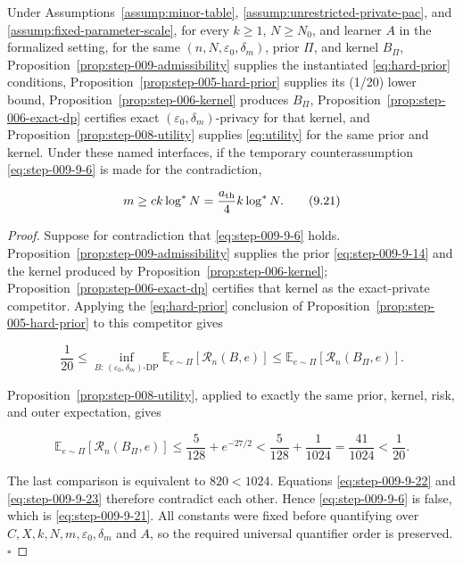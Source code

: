 \begin{proposition}
\label{prop:step-009-main-closure}
Under Assumptions~\ref{assump:minor-table},
\ref{assump:unrestricted-private-pac}, and
\ref{assump:fixed-parameter-scale}, for every \(k\ge1\), \(N\ge N_0\),
and learner \(A\) in the formalized setting, for the same
\((n,N,\varepsilon_0,\delta_m)\), prior \(\Pi\), and kernel \(B_\Pi\),
Proposition~\ref{prop:step-009-admissibility} supplies the instantiated
\eqref{eq:hard-prior} conditions, Proposition~\ref{prop:step-005-hard-prior} supplies
its (1/20) lower bound, Proposition~\ref{prop:step-006-kernel}
produces \(B_\Pi\), Proposition~\ref{prop:step-006-exact-dp} certifies
exact \((\varepsilon_0,\delta_m)\)-privacy for that kernel, and
Proposition~\ref{prop:step-008-utility} supplies \eqref{eq:utility} for the same
prior and kernel.  Under these named interfaces, if the temporary
counterassumption \eqref{eq:step-009-9-6} is made for the contradiction,

\[
m\ge c k\log^*N
=\frac{a_{\rm th}}4k\log^*N.
\tag{9.21}\label{eq:step-009-9-21}
\]

\end{proposition}

\begin{proof}
Suppose for contradiction that \eqref{eq:step-009-9-6} holds.
Proposition~\ref{prop:step-009-admissibility} supplies the prior \eqref{eq:step-009-9-14}
and the kernel produced by Proposition~\ref{prop:step-006-kernel};
Proposition~\ref{prop:step-006-exact-dp} certifies that kernel as the
exact-private competitor.  Applying the \eqref{eq:hard-prior} conclusion of
Proposition~\ref{prop:step-005-hard-prior} to this
competitor gives

\[
\frac1{20}
\le
\inf_{B:\,(\varepsilon_0,\delta_m)\text{-DP}}
\mathbb E_{e\sim\Pi}[\mathcal R_n(B,e)]
\le
\mathbb E_{e\sim\Pi}[\mathcal R_n(B_\Pi,e)].
\tag{9.22}\label{eq:step-009-9-22}
\]

Proposition~\ref{prop:step-008-utility}, applied to exactly the
same prior, kernel, risk, and outer expectation, gives

\[
\mathbb E_{e\sim\Pi}[\mathcal R_n(B_\Pi,e)]
\le\frac5{128}+e^{-27/2}
<\frac5{128}+\frac1{1024}
=\frac{41}{1024}
<\frac1{20}.
\tag{9.23}\label{eq:step-009-9-23}
\]

The last comparison is equivalent to \(820<1024\).  Equations \eqref{eq:step-009-9-22}
and \eqref{eq:step-009-9-23} therefore contradict each other.  Hence \eqref{eq:step-009-9-6} is false,
which is \eqref{eq:step-009-9-21}.  All constants were fixed before quantifying over
\(C,X,k,N,m,\varepsilon_0,\delta_m\) and \(A\), so the required
universal quantifier order is preserved.  \(\square\)

\end{proof}


